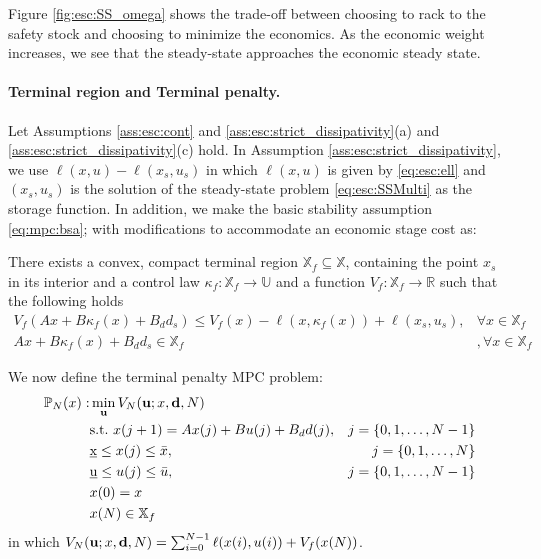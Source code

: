Figure \ref{fig:esc:SS_omega} shows the trade-off between choosing to
rack to the safety stock and choosing to minimize the economics. As
the economic weight increases, we see that the steady-state
approaches the economic steady state.

\paragraph{Terminal region and Terminal penalty.}
Let  Assumptions \ref{ass:esc:cont} and
\ref{ass:esc:strict_dissipativity}(a) and
\ref{ass:esc:strict_dissipativity}(c) hold. In Assumption
\ref{ass:esc:strict_dissipativity}, we use $\ell(x,u)-\ell(x_s,u_s)$ in
which $\ell(x,u)$ is given by \eqref{eq:esc:ell} and $(x_s,u_s)$ is the
solution of the steady-state problem \eqref{eq:esc:SSMulti} as the storage
function. In addition, we make the basic stability assumption
\ref{eq:mpc:bsa}; with modifications to accommodate an economic stage
cost as:

\begin{assumption}
\label{ass:esc:bsa}
There exists a convex, compact terminal region $\mathbb{X}_f \subseteq
\mathbb{X}$, containing the point $x_s$ in its interior and a control
law $\kappa_f: \mathbb{X}_f \rightarrow \mathbb{U}$  and a function
$V_f:\mathbb{X}_f \rightarrow \mathbb{R}$ such that the
following holds
\begin{align}
\label{eq:esc:BSA}
V_f(Ax+B\kappa_f(x)+B_dd_s) \leq V_f(x)-\ell(x,\kappa_f(x))+\ell(x_s,u_s),&\forall x \in \mathbb{X}_f  \\
\label{eq:esc:invariant}
Ax+ B\kappa_f(x) +B_dd_s \in \mathbb{X}_f&,\forall x \in \mathbb{X}_f 
\end{align}
\end{assumption}

We now define the terminal penalty MPC problem:
\begin{alignat}{2}
\label{eq:esc:PP}
\mathbb{P}_N(x):& \min_{\bu}{V_N(\bu;x,\bd,N)}& \nonumber \\
&\text{s.t.~} x(j+1) = Ax(j) + Bu(j)+B_dd(j),& j = \set{0,1,\ldots,N-1}\nonumber\\
&\underbar{x} \leq x(j) \leq \bar{x},& j = \set{0,1,\ldots,N}  \\
&\underbar{u} \leq u(j) \leq \bar{u},&j = \set{0,1,\ldots,N-1}
\nonumber\\
&x(0) = x & \nonumber \\
&x(N) \in \mathbb{X}_f & \nonumber %
\end{alignat}
in which $V_N(\mathbf{u};x,\mathbf{d},N) = \sum_{i=0}^{N-1}
\ell(x(i),u(i))+ V_f(x(N))$.


